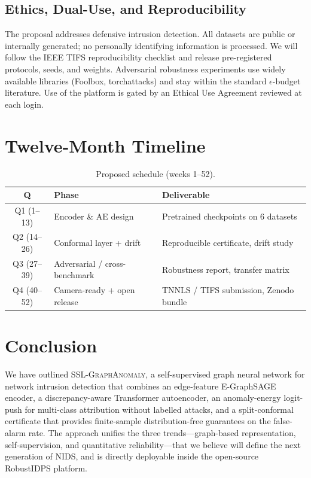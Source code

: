 \documentclass[journal,twoside]{IEEEtran}
\begin{document}
\subsection{Ethics, Dual-Use, and Reproducibility}
The proposal addresses defensive intrusion detection.  All datasets are
public or internally generated; no personally identifying information
is processed.  We will follow the IEEE TIFS reproducibility checklist
and release pre-registered protocols, seeds, and weights.  Adversarial
robustness experiments use widely available libraries (Foolbox,
torchattacks) and stay within the standard $\epsilon$-budget literature.
Use of the platform is gated by an Ethical Use Agreement reviewed at
each login.

\section{Twelve-Month Timeline}
\label{sec:plan}

\begin{table}[h]
  \centering
  \caption{Proposed schedule (weeks 1--52).}
  \footnotesize
  \begin{tabular}{c l l}
    \toprule
    \textbf{Q} & \textbf{Phase} & \textbf{Deliverable} \\
    \midrule
    Q1 (1--13)  & Encoder \& AE design          & Pretrained checkpoints on 6 datasets \\
    Q2 (14--26) & Conformal layer + drift       & Reproducible certificate, drift study \\
    Q3 (27--39) & Adversarial / cross-benchmark & Robustness report, transfer matrix \\
    Q4 (40--52) & Camera-ready + open release   & TNNLS / TIFS submission, Zenodo bundle \\
    \bottomrule
  \end{tabular}
\end{table}

\section{Conclusion}
We have outlined \textsc{SSL-GraphAnomaly}, a self-supervised graph
neural network for network intrusion detection that combines an
edge-feature E-GraphSAGE encoder, a discrepancy-aware Transformer
autoencoder, an anomaly-energy logit-push for multi-class attribution
without labelled attacks, and a split-conformal certificate that
provides finite-sample distribution-free guarantees on the false-alarm
rate.  The approach unifies the three trends---graph-based representation,
self-supervision, and quantitative reliability---that we believe will
define the next generation of NIDS, and is directly deployable inside
the open-source RobustIDPS platform.
\end{document}

